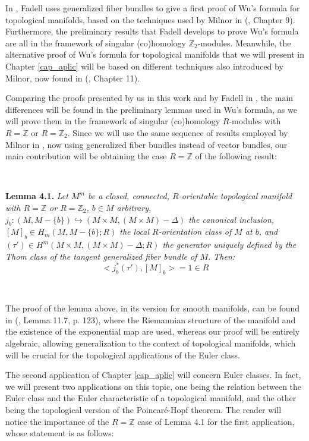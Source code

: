 \documentclass[12pt,oneside]{book}
\newcommand{\Z}{\mathbb{Z}}
\begin{document}
    In \cite{fadell_1}, Fadell uses generalized fiber bundles to give a first proof of Wu's formula for 
    topological manifolds, based on the techniques used by Milnor in (\cite{milnor_2}, Chapter 9). 
    Furthermore, the preliminary results that Fadell develops to prove Wu's formula are all in the 
    framework of singular (co)homology $\Z_{2}$-modules. Meanwhile, the alternative proof of Wu's 
    formula for topological manifolds that we will present in Chapter \ref{cap_aplic} will be based on 
    different techniques also introduced by Milnor, now found in (\cite{milnor_1}, Chapter 11).

    Comparing the proofs presented by us in this work and by Fadell in \cite{fadell_1}, the main 
    differences will be found in the preliminary lemmas used in Wu's formula, as we will prove them in 
    the framework of singular (co)homology $R$-modules with $R=\Z$ or $R=\Z_{2}$. Since we will use the 
    same sequence of results employed by Milnor in \cite{milnor_1}, now using generalized fiber bundles 
    instead of vector bundles, our main contribution will be obtaining the case $R=\Z$ of the following 
    result:

    \

    \textbf{Lemma 4.1.} \textit{Let $M^{m}$ be a closed, connected, $R$-orientable topological manifold 
    with $R=\Z$ or $R=\Z_{2}$, $b\in M$ arbitrary, 
    $j_{b}:(M,M-\{b\})\hookrightarrow (M\times M,(M\times M)-\Delta)$ the canonical inclusion, 
    $[M]_{b}\in H_{m}(M,M-\{b\};R)$ the local $R$-orientation class of $M$ at $b$, and 
    $(\tau')\in H^{m}(M\times M,(M\times M)-\Delta;R)$ the generator uniquely defined by the Thom class 
    of the tangent generalized fiber bundle of $M$. Then:
        $$ <j_{b}^{*}(\tau'),[M]_{b}>=1\in R $$}
    
    \

    The proof of the lemma above, in its version for smooth manifolds, can be found in (\cite{milnor_1}, 
    Lemma 11.7, p. 123), where the Riemannian structure of the manifold and the existence of the 
    exponential map are used, whereas our proof will be entirely algebraic, allowing generalization to 
    the context of topological manifolds, which will be crucial for the topological applications of the 
    Euler class.

    The second application of Chapter \ref{cap_aplic} will concern Euler classes. In fact, we will 
    present two applications on this topic, one being the relation between the Euler class and the Euler 
    characteristic of a topological manifold, and the other being the topological version of the 
    Poincaré-Hopf theorem. The reader will notice the importance of the $R=\Z$ case of Lemma 4.1 for the 
    first application, whose statement is as follows:
\end{document}
